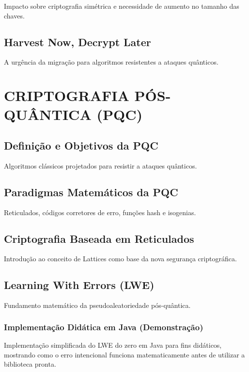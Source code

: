 \documentclass[
	12pt,				%
	openright,			%
	oneside,			%
	a4paper,			%
	portuguese,			%
	brazil				%
	]{abntex2}
\begin{document}
Impacto sobre criptografia simétrica e necessidade de aumento no tamanho das chaves.

\section{Harvest Now, Decrypt Later}

A urgência da migração para algoritmos resistentes a ataques quânticos.

\chapter{CRIPTOGRAFIA PÓS-QUÂNTICA (PQC)} %

\section{Definição e Objetivos da PQC}

Algoritmos clássicos projetados para resistir a ataques quânticos.

\section{Paradigmas Matemáticos da PQC}

Reticulados, códigos corretores de erro, funções hash e isogenias.

\section{Criptografia Baseada em Reticulados}

Introdução ao conceito de Lattices como base da nova segurança criptográfica.

\section{Learning With Errors (LWE)}

Fundamento matemático da pseudoaleatoriedade pós-quântica.

\subsection{Implementação Didática em Java (Demonstração)}

Implementação simplificada do LWE do zero em Java para fins didáticos, mostrando como o erro intencional funciona matematicamente antes de utilizar a biblioteca pronta.
\end{document}
